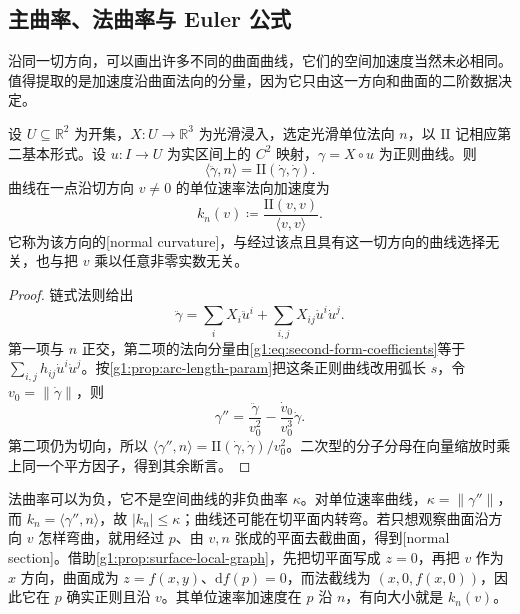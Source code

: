 \subsection{主曲率、法曲率与 Euler 公式}
\label{g1:subsec:0802:02}

沿同一切方向，可以画出许多不同的曲面曲线，它们的空间加速度当然未必相同。值得提取的是加速度沿曲面法向的分量，因为它只由这一方向和曲面的二阶数据决定。

\begin{proposition}\label{g1:prop:surface-normal-acceleration}
	设 \(U\subseteq\mathbb R^2\) 为开集，\(X:U\to\mathbb R^3\) 为光滑浸入，选定光滑单位法向 \(n\)，以 \(\mathrm{II}\) 记相应第二基本形式。设 \(u:I\to U\) 为实区间上的 \(C^2\) 映射，\(\gamma=X\circ u\) 为正则曲线。则
	\[
		\langle\ddot\gamma,n\rangle=\mathrm{II}(\dot\gamma,\dot\gamma).
	\]
	曲线在一点沿切方向 \(v\ne0\) 的单位速率法向加速度为
	\begin{equation}\label{g1:eq:normal-curvature-quotient}
		k_n(v)\coloneqq\frac{\mathrm{II}(v,v)}{\langle v,v\rangle}.
	\end{equation}
	它称为该方向的[normal curvature]，与经过该点且具有这一切方向的曲线选择无关，也与把 \(v\) 乘以任意非零实数无关。
\end{proposition}
\begin{proof}
	链式法则给出
	\[
		\ddot\gamma=\sum_iX_i\ddot u^i+\sum_{i,j}X_{ij}\dot u^i\dot u^j.
	\]
	第一项与 \(n\) 正交，第二项的法向分量由\eqref{g1:eq:second-form-coefficients}等于 \(\sum_{i,j}h_{ij}\dot u^i\dot u^j\)。按\cref{g1:prop:arc-length-param}把这条正则曲线改用弧长 \(s\)，令 \(v_0=\lVert\dot\gamma\rVert\)，则
	\[
		\gamma''=\frac{\ddot\gamma}{v_0^2}-\frac{\dot v_0}{v_0^3}\dot\gamma.
	\]
	第二项仍为切向，所以 \(\langle\gamma'',n\rangle=\mathrm{II}(\dot\gamma,\dot\gamma)/v_0^2\)。二次型的分子分母在向量缩放时乘上同一个平方因子，得到其余断言。
\end{proof}

法曲率可以为负，它不是空间曲线的非负曲率 \(\kappa\)。对单位速率曲线，\(\kappa=\lVert\gamma''\rVert\)，而 \(k_n=\langle\gamma'',n\rangle\)，故 \(|k_n|\le\kappa\)；曲线还可能在切平面内转弯。若只想观察曲面沿方向 \(v\) 怎样弯曲，就用经过 \(p\)、由 \(v,n\) 张成的平面去截曲面，得到[normal section]。借助\cref{g1:prop:surface-local-graph}，先把切平面写成 \(z=0\)，再把 \(v\) 作为 \(x\) 方向，曲面成为 \(z=f(x,y)\)、\(\mathrm df(p)=0\)，而法截线为 \((x,0,f(x,0))\)，因此它在 \(p\) 确实正则且沿 \(v\)。其单位速率加速度在 \(p\) 沿 \(n\)，有向大小就是 \(k_n(v)\)。

